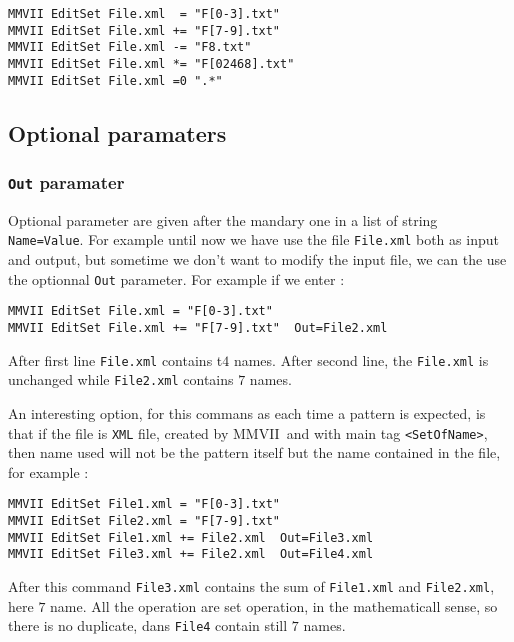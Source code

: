 \documentclass[a4paper]{book}
\newcommand{\PPP}{MMVII}
\begin{document}
\begin{verbatim}
MMVII EditSet File.xml  = "F[0-3].txt"
MMVII EditSet File.xml += "F[7-9].txt"
MMVII EditSet File.xml -= "F8.txt"
MMVII EditSet File.xml *= "F[02468].txt"
MMVII EditSet File.xml =0 ".*"
\end{verbatim}


\subsection{Optional paramaters}

\subsubsection{{\tt Out} paramater}

Optional parameter are given after  the  mandary one in a list of 
string {\tt Name=Value}. For example until now we have use
the file {\tt File.xml} both as input and output, but sometime
we don't want to modify the input file, we can the use the optionnal
{\tt Out} parameter. For example if we enter :

\begin{verbatim}
MMVII EditSet File.xml = "F[0-3].txt" 
MMVII EditSet File.xml += "F[7-9].txt"  Out=File2.xml
\end{verbatim}

After first line {\tt File.xml} contains t$4$ names.
After second line, the  {\tt File.xml} is unchanged
while  {\tt File2.xml} contains $7$ names.


An interesting option, for this commans as each time
a pattern is expected, is that if the file is {\tt XML}
file, created by \PPP\, and with main tag {\tt <SetOfName>},
then name used will not be the pattern itself but the name
contained in the file, for example : 

\begin{verbatim}
MMVII EditSet File1.xml = "F[0-3].txt"  
MMVII EditSet File2.xml = "F[7-9].txt"  
MMVII EditSet File1.xml += File2.xml  Out=File3.xml
MMVII EditSet File3.xml += File2.xml  Out=File4.xml
\end{verbatim}

After this command {\tt File3.xml} contains the sum of {\tt File1.xml} and {\tt File2.xml},
here $7$ name. All the operation are set operation, in the mathematicall sense, so there is
no duplicate, dans {\tt File4} contain still $7$ names.
\end{document}
